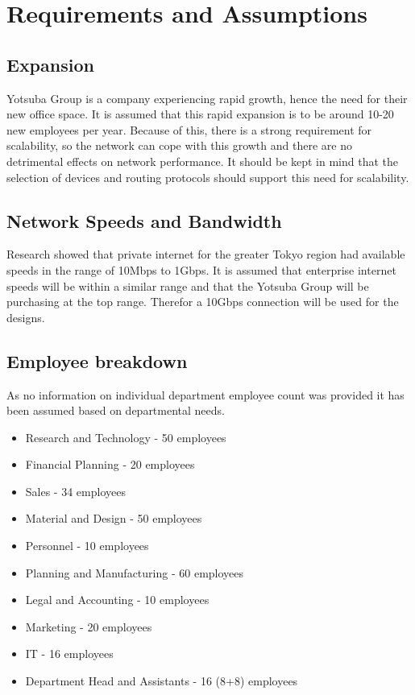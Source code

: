 \chapter{Requirements and Assumptions}

\section{Expansion}
Yotsuba Group is a company experiencing rapid growth, hence the need for their new office space. It is assumed that this rapid expansion is to be around 10-20 new employees per year. Because of this, there is a strong requirement for scalability, so the network can cope with this growth and there are no detrimental effects on network performance. It should be kept in mind that the selection of devices and routing protocols should support this need for scalability.
\section{Network Speeds and Bandwidth}
Research showed that private internet for the greater Tokyo region had available speeds in the range of 10Mbps to 1Gbps. It is assumed that enterprise internet speeds will be within a similar range and that the Yotsuba Group will be purchasing at the top range. Therefor a 10Gbps connection will be used for the designs.
\section{Employee breakdown}
As no information on individual department employee count was provided it has been assumed based on departmental needs.
\begin{itemize}
    \item Research and Technology - 50 employees
    \item Financial Planning - 20 employees
    \item Sales - 34 employees
    \item Material and Design - 50 employees
    \item Personnel - 10 employees
    \item Planning and Manufacturing - 60 employees
    \item Legal and Accounting - 10 employees
    \item Marketing - 20 employees
    \item IT - 16 employees
    \item Department Head and Assistants - 16 (8+8) employees
\end{itemize}
